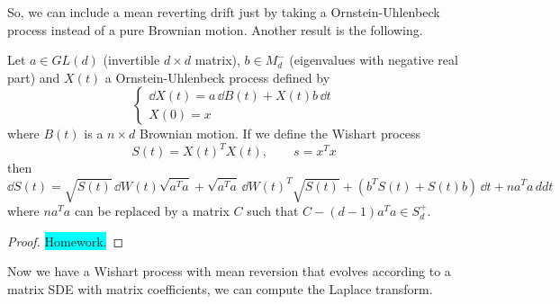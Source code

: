 So, we can include a mean reverting drift just by taking a Ornstein-Uhlenbeck process instead of a pure Brownian motion. Another result is the following.
\begin{theorem}
    Let $a\in GL(d)$ (invertible $d\times d$ matrix), $b\in M_d^-$ (eigenvalues with negative real part) and $X(t)$ a Ornstein-Uhlenbeck process defined by
    \begin{equation}
        \begin{cases}
            \dd X(t) = a\,\dd B(t) + X(t)b\,\dd t \\
            X(0) = x
        \end{cases}
    \end{equation}
    where $B(t)$ is a $n\times d$ Brownian motion. If we define the Wishart process
    \begin{equation}
        S(t) = X(t)^TX(t), \qquad s = x^Tx
    \end{equation}
    then
    \begin{equation}
        \dd S(t) = \sqrt{S(t)}\,\dd W(t)\sqrt{a^Ta} + \sqrt{a^Ta}\,\dd W(t)^T\sqrt{S(t)} + (b^TS(t) + S(t)b)\,\dd t + na^Ta\,dd t
    \end{equation}
    where $na^Ta$ can be replaced by a matrix $C$ such that $C - (d-1)a^Ta \in S^+_d$.
\end{theorem}
\begin{proof}
    \colorbox{cyan}{Homework.}
\end{proof}
Now we have a Wishart process with mean reversion that evolves according to a matrix SDE with matrix coefficients, we can compute the Laplace transform.


